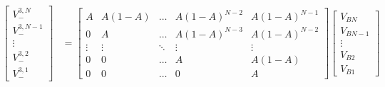 \documentclass[conference]{IEEEtran}
\begin{document}
	\begin{figure}
		\begin{equation}
		\begin{split}
		\begin{bmatrix}
		V_-^{3,N} \\
		V_-^{3,N-1} \\
		\vdots\\
		V_-^{3,2} \\ 
		V_-^{3,1}
		\end{bmatrix}
		&\!=\!
		\begin{bmatrix}
		A \!& A(1-A) & \dots & A(1\!-\!A)^{N-2} & A(1\!-\!A)^{N-1} \\
		0 \!& A & \dots & A(1\!-\!A)^{N-3} \! & A(1\!-\!A)^{N-2}\\
		\vdots & \vdots & \ddots & \vdots & \vdots \\
		0 \!&  0& \dots & A & A(1-A) \\ 
		0 \!& 0 \!& \dots & 0 & A 
		\end{bmatrix}\!\begin{bmatrix}
		V_{BN} \\
		V_{BN-1} \\
		\vdots \\
		V_{B2} \\
		V_{B1}
		\end{bmatrix}
		\end{split}
		\label{eq:V_3}
		\end{equation}
	\end{figure}
	
\end{document}
